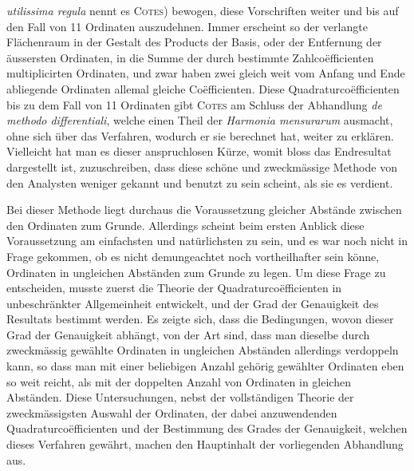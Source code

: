 \textit{utilissima regula} nennt es \textsc{Cotes}) bewogen, diese Vorschriften weiter und bis auf
den Fall von 11 Ordinaten auszudehnen. Immer erscheint so der verlangte
Flächenraum in der Gestalt des Products der Basis, oder der Entfernung der
äussersten Ordinaten, in die Summe der durch bestimmte Zahlcoëfficienten multiplicirten
Ordinaten, und zwar haben zwei gleich weit vom Anfang und Ende
abliegende Ordinaten allemal gleiche Coëfficienten. Diese Quadraturcoëfficienten
bis zu dem Fall von 11 Ordinaten gibt \textsc{Cotes} am Schluss der Abhandlung \textit{de methodo differentiali},
welche einen Theil der \textit{Harmonia mensurarum} ausmacht, ohne
sich über das Verfahren, wodurch er sie berechnet hat, weiter zu erklären. Vielleicht
hat man es dieser anspruchlosen Kürze, womit bloss das Endresultat dargestellt
ist, zuzuschreiben, dass diese schöne und zweckmässige Methode von den
Analysten weniger gekannt und benutzt zu sein scheint, als sie es verdient.

Bei dieser Methode liegt durchaus die Voraussetzung gleicher Abstände zwischen
den Ordinaten zum Grunde. Allerdings scheint beim ersten Anblick diese
Voraussetzung am einfachsten und natürlichsten zu sein, und es war noch nicht
in Frage gekommen, ob es nicht demungeachtet noch vortheilhafter sein könne,
Ordinaten in ungleichen Abständen zum Grunde zu legen. Um diese Frage zu
entscheiden, musste zuerst die Theorie der Quadraturcoëfficienten in unbeschränkter
Allgemeinheit entwickelt, und der Grad der Genauigkeit des Resultats bestimmt
werden. Es zeigte sich, dass die Bedingungen, wovon dieser Grad der
Genauigkeit abhängt, von der Art sind, dass man dieselbe durch zweckmässig
gewählte Ordinaten in ungleichen Abständen allerdings verdoppeln kann, so dass
man mit einer beliebigen Anzahl gehörig gewählter Ordinaten eben so weit reicht,
als mit der doppelten Anzahl von Ordinaten in gleichen Abständen. Diese Untersuchungen,
nebst der vollständigen Theorie der zweckmässigsten Auswahl der
Ordinaten, der dabei anzuwendenden Quadraturcoëfficienten und der Bestimmung
des Grades der Genauigkeit, welchen dieses Verfahren gewährt, machen den
Hauptinhalt der vorliegenden Abhandlung aus.

